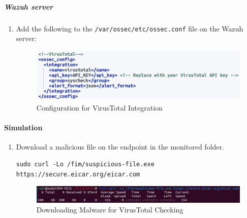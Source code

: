 \subparagraph{Wazuh server}
\begin{enumerate}
    \item Add the following to the \texttt{/var/ossec/etc/ossec.conf} file on the Wazuh server:
    \begin{figure}[H]
        \centering
        \includegraphics[width=\textwidth]{images/malware-detection/virustotal/1.png}
        \caption{Configuration for VirusTotal Integration}
        \label{fig:virustotal-conf}
    \end{figure}
\end{enumerate}

\paragraph{Simulation}
\begin{enumerate}
    \item Download a malicious file on the endpoint in the monitored folder.
    \begin{verbatim}
sudo curl -Lo /fim/suspicious-file.exe https://secure.eicar.org/eicar.com
    \end{verbatim}
    \begin{figure}[H]
        \centering
        \includegraphics[width=\textwidth]{images/malware-detection/virustotal/2.png}
        \caption{Downloading Malware for VirusTotal Checking}
        \label{fig:virustotal-malware}
    \end{figure}
\end{enumerate}

